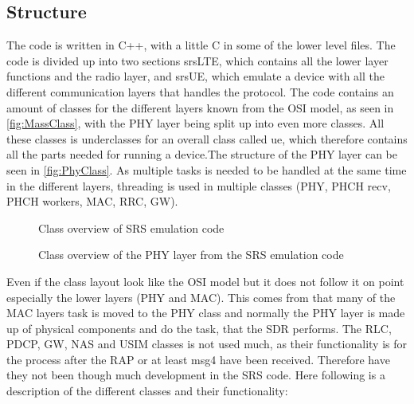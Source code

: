 \subsection{Structure}
\label{sub:MassStruct}
The code is written in C++, with a little C in some of the lower level files. The code is divided up into two sections srsLTE, which contains all the lower layer functions and the radio layer, and srsUE, which emulate a device with all the different communication layers that handles the protocol. The code contains an amount of classes for the different layers known from the OSI model, as seen in \autoref{fig:MassClass}, with the PHY layer being split up into even more classes. All these classes is underclasses for an overall class called ue, which therefore contains all the parts needed for running a device.The structure of the PHY layer can be seen in \autoref{fig:PhyClass}. As multiple tasks is needed to be handled at the same time in the different layers, threading is used in multiple classes (PHY, PHCH recv, PHCH workers, MAC, RRC, GW).

\begin{figure}[H]
\centering
\resizebox{0.5\textwidth}{!}{
}
\caption{Class overview of SRS emulation code}
\label{fig:MassClass}
\end{figure}

\begin{figure}[H]
\centering
{}
\resizebox{0.5\textwidth}{!}{
}
\caption{Class overview of the PHY layer from the SRS emulation code}
\label{fig:PhyClass}
\end{figure}

Even if the class layout look like the OSI model but it does not follow it on point especially the lower layers (PHY and MAC). This comes from that many of the MAC layers task is moved to the PHY class and normally the PHY layer is made up of physical components and do the task, that the SDR performs. The RLC, PDCP, GW, NAS and USIM classes is not used much, as their functionality is for the process after the RAP or at least msg4 have been received. Therefore have they not been though much development in the SRS code. Here following is a description of the different classes and their functionality:

